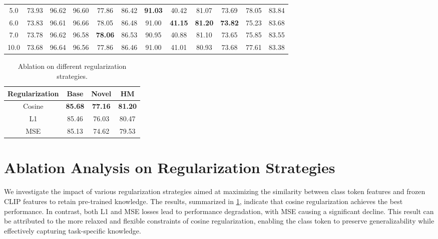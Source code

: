 \begin{table*}[h]
{\begin{tabular}{@{}c|ccccccccccc@{}}
    5.0  & 73.93 & 96.62 & 96.60          & 77.86          & 86.42          & \textbf{91.03} & 40.42 & 81.07 & 73.69 & 78.05          & 83.84          \\
    6.0      & 73.83          & 96.61          & 96.66      & 78.05        & 86.48      & 91.00   & \textbf{41.15} & \textbf{81.20} & \textbf{73.82} & 75.23   & 83.68  \\
    7.0  & 73.78 & 96.62 & 96.58          & \textbf{78.06} & 86.53          & 90.95          & 40.88 & 81.10 & 73.65 & 75.85          & 83.55          \\
    10.0 & 73.68 & 96.64 & 96.56          & 77.86          & 86.46          & 91.00          & 41.01 & 80.93 & 73.68 & 77.61          & 83.38          \\ \bottomrule
    \end{tabular}
}
\end{table*}

\begin{table}[t]
\small
\centering
\caption{Ablation on different regularization strategies.}
\label{ablation_regularization}
\begin{tabular}{@{}c|ccc@{}}
\toprule
Regularization & Base           & Novel          & HM             \\ \midrule
\rowcolor[HTML]{EFEFEF} 
Cosine         & \textbf{85.68} & \textbf{77.16} & \textbf{81.20} \\
L1             & 85.46          & 76.03          & 80.47          \\
MSE             & 85.13          & 74.62          & 79.53          \\ \bottomrule
\end{tabular}
\end{table}

\section{Ablation Analysis on Regularization Strategies}
We investigate the impact of various regularization strategies aimed at maximizing the similarity between class token features and frozen CLIP features to retain pre-trained knowledge. The results, summarized in \cref{ablation_regularization}, indicate that cosine regularization achieves the best performance. In contrast, both L1 and MSE losses lead to performance degradation, with MSE causing a significant decline. This result can be attributed to the more relaxed and flexible constraints of cosine regularization, enabling the class token to preserve generalizability while effectively capturing task-specific knowledge.






